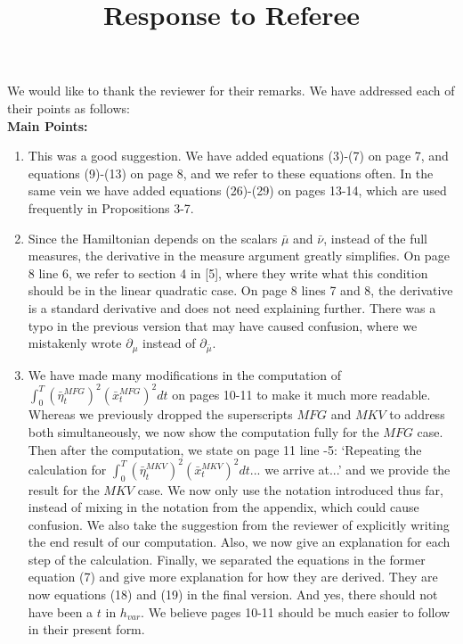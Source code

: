\documentclass[]{article}
\title{Response to Referee}
\author{}
\begin{document}
\maketitle

We would like to thank the reviewer for their remarks. We have addressed each of their points as follows:\\

\hspace{-7mm} \textbf{Main Points:}
\begin{enumerate}
	\item This was a good suggestion. We have added equations (3)-(7) on page 7, and equations (9)-(13) on page 8, and we refer to these equations often. In the same vein we have added equations (26)-(29) on pages 13-14, which are used frequently in Propositions 3-7.
	\item Since the Hamiltonian depends on the scalars $\bar{\mu}$ and $\bar{\nu}$, instead of the full measures, the derivative in the measure argument greatly simplifies. On page 8 line 6, we refer to section 4 in [5], where they write what this condition should be in the linear quadratic case. On page 8 lines 7 and 8, the derivative is a standard derivative and does not need explaining further. There was a typo in the previous version that may have caused confusion, where we mistakenly wrote $\partial_{\mu}$ instead of $\partial_{\bar{\mu}}$.
	\item We have made many modifications in the computation of $\int_0^T (\bar{\eta}^{MFG}_t)^2 (\bar{x}^{MFG}_t)^2dt$ on pages 10-11 to make it much more readable. Whereas we previously dropped the superscripts $MFG$ and $MKV$ to address both simultaneously, we now show the computation fully for the $MFG$ case. Then after the computation, we state on page 11 line -5: `Repeating the calculation for $\int_0^T (\bar{\eta}^{MKV}_t)^2 (\bar{x}^{MKV}_t)^2dt$... we arrive at...' and we provide the result for the $MKV$ case. We now only use the notation introduced thus far, instead of mixing in the notation from the appendix, which could cause confusion. We also take the suggestion from the reviewer of explicitly writing the end result of our computation. Also, we now give an explanation for each step of the calculation. Finally, we separated the equations in the former equation (7) and give more explanation for how they are derived. They are now equations (18) and (19) in the final version. And yes, there should not have been a $t$ in $h_{var}$. We believe pages 10-11 should be much easier to follow in their present form.

\end{enumerate}
\end{document}

